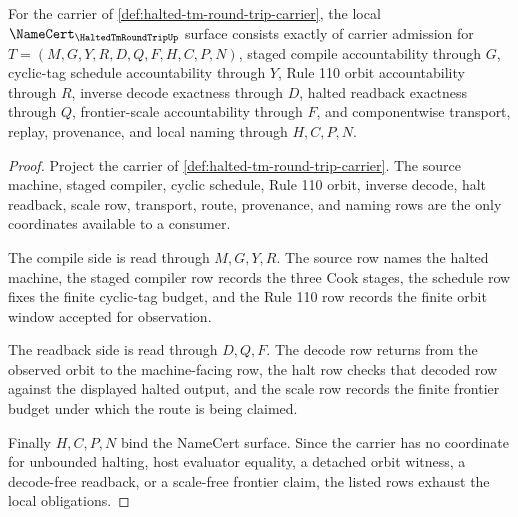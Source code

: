 \begin{theorem}
\label{thm:halted-tm-round-trip-namecert-obligations}
For the carrier of \autoref{def:halted-tm-round-trip-carrier}, the local $\NameCert_{\HaltedTmRoundTripUp}$ surface consists exactly of carrier admission for $T=(M,G,Y,R,D,Q,F,H,C,P,N)$, staged compile accountability through $G$, cyclic-tag schedule accountability through $Y$, Rule 110 orbit accountability through $R$, inverse decode exactness through $D$, halted readback exactness through $Q$, frontier-scale accountability through $F$, and componentwise transport, replay, provenance, and local naming through $H,C,P,N$.
\end{theorem}
\begin{proof}
Project the carrier of \autoref{def:halted-tm-round-trip-carrier}. The source machine, staged compiler, cyclic schedule, Rule 110 orbit, inverse decode, halt readback, scale row, transport, route, provenance, and naming rows are the only coordinates available to a consumer.

The compile side is read through $M,G,Y,R$. The source row names the halted machine, the staged compiler row records the three Cook stages, the schedule row fixes the finite cyclic-tag budget, and the Rule 110 row records the finite orbit window accepted for observation.

The readback side is read through $D,Q,F$. The decode row returns from the observed orbit to the machine-facing row, the halt row checks that decoded row against the displayed halted output, and the scale row records the finite frontier budget under which the route is being claimed.

Finally $H,C,P,N$ bind the NameCert surface. Since the carrier has no coordinate for unbounded halting, host evaluator equality, a detached orbit witness, a decode-free readback, or a scale-free frontier claim, the listed rows exhaust the local obligations.
\end{proof}

